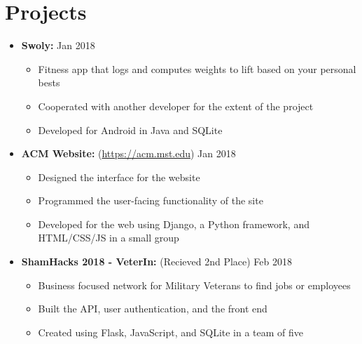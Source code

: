 \documentclass[10pt,oneside]{article}
\begin{document}
\section*{Projects}
\vspace*{-5pt}
\begin{itemize}
	\item[] \textbf{Swoly:}
		\hfill
		Jan 2018
			\begin{itemize}
				\item[\textbullet] Fitness app that logs and computes weights to lift based on your personal bests
				\item[\textbullet] Cooperated with another developer for the extent of the project
				\item[\textbullet] Developed for Android in Java and SQLite
			\end{itemize}
	\item[] \textbf{ACM Website:} (\url{https://acm.mst.edu})
		\hfill
		Jan 2018
			\begin{itemize}
				\item[\textbullet] Designed the interface for the website
				\item[\textbullet] Programmed the user-facing functionality of the site
				\item[\textbullet] Developed for the web using Django, a Python framework, and HTML/CSS/JS in a small group
			\end{itemize}
	\item[] \textbf{ShamHacks 2018 - VeterIn:} (Recieved 2nd Place)
		\hfill
		Feb 2018
			\begin{itemize}
				\item[\textbullet] Business focused network for Military Veterans to find jobs or employees
				\item[\textbullet] Built the API, user authentication, and the front end
				\item[\textbullet] Created using Flask, JavaScript, and SQLite in a team of five
			\end{itemize}
\end{itemize}

\vspace*{-17pt}
\end{document}
